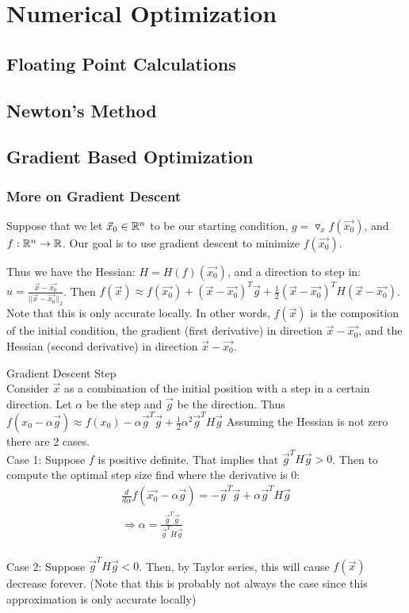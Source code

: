 
\chapter{Numerical Optimization}
\label{numerics}

\section{Floating Point Calculations}

\section{Newton's Method}

\section{Gradient Based Optimization}
\label{gradient-optimization}

\subsection{More on Gradient Descent}
\label{gradient descent}
Suppose that we let $\vec{x}_0\in \R^n$ to be our starting condition,
$g=\triangledown_x f(\vec{x_0})$, and $f: \R^n\rightarrow\R$.
Our goal is to use gradient descent to minimize $f(\vec{x_0})$.

Thus we have the Hessian: $H=H(f)(\vec{x_0})$, and a direction to step in:  $\hat{u}=\frac{\vec{x}-\vec{x_0}}{||\vec{x}-\vec{x_0}||_2}$. Then $f(\vec{x})\approx f(\vec{x_0})+(\vec{x}-\vec{x_0})^T\vec{g}+\frac{1}{2}(\vec{x}-\vec{x_0})^TH(\vec{x}-\vec{x_0})$. Note that this is only accurate locally. In other words, $f(\vec{x})$ is the composition of the initial condition, the gradient (first derivative) in direction $\vec{x}-\vec{x_0}$, and the Hessian (second derivative) in direction $\vec{x}-\vec{x_0}$.

\begin{definition}
Gradient Descent Step\\
Consider $\vec{x}$ as a combination of the initial position with a step in a certain direction. Let $\alpha$ be the step and $\vec{g}$ be the direction.
Thus $f(x_0-\alpha\vec{g})\approx f(x_0)-\alpha \vec{g}^T\vec{g}+\frac{1}{2}\alpha^2\vec{g}^TH\vec{g}$ Assuming the Hessian is not zero there are 2 cases.\\
Case 1: Suppose $f$ is positive definite. That implies that $\vec{g}^TH\vec{g}>0$. Then to compute the optimal step size find where the derivative is 0:
\begin{align*}
    \frac{d}{d\alpha}f(\vec{x_0}-\alpha \vec{g})=-\vec{g}^T\vec{g}+\alpha\vec{g}^TH\vec{g}\\
    \Longrightarrow \alpha=\frac{\vec{g}^T\vec{g}}{\vec{g}^TH\vec{g}}
\end{align*}\\
Case 2: Suppose $\vec{g}^TH\vec{g}<0$. Then, by Taylor series, this will cause $f(\vec{x})$ decrease forever. (Note that this is probably not always the case since this approximation is only accurate locally)\\
\end{definition}

